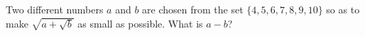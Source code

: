 Two different numbers $a$ and $b$ are chosen from the set $\{4,5,6,7,8,9,10\}$ so as to make $\sqrt{a+\sqrt b}$ as small as possible. What is $a-b$?
